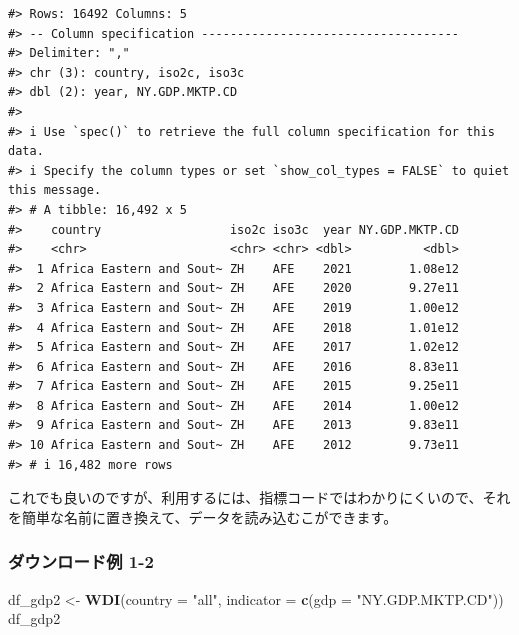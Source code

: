 \documentclass[
  xelatex, ja=standard]{bxjsbook}
\newenvironment{Shaded}{\begin{snugshade}}{\end{snugshade}}
\newcommand{\AttributeTok}[1]{\textcolor[rgb]{0.13,0.29,0.53}{#1}}
\newcommand{\FunctionTok}[1]{\textcolor[rgb]{0.13,0.29,0.53}{\textbf{#1}}}
\newcommand{\NormalTok}[1]{#1}
\newcommand{\OtherTok}[1]{\textcolor[rgb]{0.56,0.35,0.01}{#1}}
\newcommand{\StringTok}[1]{\textcolor[rgb]{0.31,0.60,0.02}{#1}}
\theoremstyle{definition}
\theoremstyle{definition}
\theoremstyle{definition}
\theoremstyle{definition}
\theoremstyle{remark}
\begin{document}
\begin{verbatim}
#> Rows: 16492 Columns: 5
#> -- Column specification ------------------------------------
#> Delimiter: ","
#> chr (3): country, iso2c, iso3c
#> dbl (2): year, NY.GDP.MKTP.CD
#> 
#> i Use `spec()` to retrieve the full column specification for this data.
#> i Specify the column types or set `show_col_types = FALSE` to quiet this message.
#> # A tibble: 16,492 x 5
#>    country                  iso2c iso3c  year NY.GDP.MKTP.CD
#>    <chr>                    <chr> <chr> <dbl>          <dbl>
#>  1 Africa Eastern and Sout~ ZH    AFE    2021        1.08e12
#>  2 Africa Eastern and Sout~ ZH    AFE    2020        9.27e11
#>  3 Africa Eastern and Sout~ ZH    AFE    2019        1.00e12
#>  4 Africa Eastern and Sout~ ZH    AFE    2018        1.01e12
#>  5 Africa Eastern and Sout~ ZH    AFE    2017        1.02e12
#>  6 Africa Eastern and Sout~ ZH    AFE    2016        8.83e11
#>  7 Africa Eastern and Sout~ ZH    AFE    2015        9.25e11
#>  8 Africa Eastern and Sout~ ZH    AFE    2014        1.00e12
#>  9 Africa Eastern and Sout~ ZH    AFE    2013        9.83e11
#> 10 Africa Eastern and Sout~ ZH    AFE    2012        9.73e11
#> # i 16,482 more rows
\end{verbatim}

これでも良いのですが、利用するには、指標コードではわかりにくいので、それを簡単な名前に置き換えて、データを読み込むこができます。

\hypertarget{ux30c0ux30a6ux30f3ux30edux30fcux30c9ux4f8b-1-2}{%
\subsubsection{ダウンロード例 1-2}\label{ux30c0ux30a6ux30f3ux30edux30fcux30c9ux4f8b-1-2}}

\begin{Shaded}
\begin{Highlighting}[]
\NormalTok{df\_gdp2 }\OtherTok{\textless{}{-}} \FunctionTok{WDI}\NormalTok{(}\AttributeTok{country =} \StringTok{"all"}\NormalTok{, }\AttributeTok{indicator =} \FunctionTok{c}\NormalTok{(}\AttributeTok{gdp =} \StringTok{"NY.GDP.MKTP.CD"}\NormalTok{))}
\NormalTok{df\_gdp2}
\end{Highlighting}
\end{Shaded}
\end{document}
